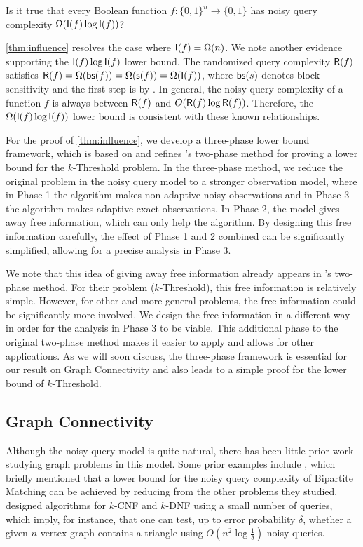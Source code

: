 \begin{open} \label{open:influence}
Is it true that every Boolean function $f: \{0, 1\}^n \rightarrow \{0, 1\}$ has noisy query complexity $\Omega(\operatorname{\mathsf{I}}(f) \log \operatorname{\mathsf{I}}(f))$?
\end{open}
\cref{thm:influence} resolves the case where $\operatorname{\mathsf{I}}(f) = \Omega(n)$. We note another evidence supporting the $\operatorname{\mathsf{I}}(f) \log \operatorname{\mathsf{I}}(f)$ lower bound. The randomized query complexity $\operatorname{\mathsf{R}}(f)$ satisfies $\operatorname{\mathsf{R}}(f) = \Omega(\operatorname{\mathsf{bs}}(f)) = \Omega(\operatorname{\mathsf{s}}(f)) = \Omega(\operatorname{\mathsf{I}}(f))$, where $\operatorname{\mathsf{bs}}(s)$ denotes block sensitivity and the first step is by \cite[Lemma 4.2]{nisan1989crew}. In general, the noisy query complexity of a function $f$ is always between $\operatorname{\mathsf{R}}(f)$ and $O(\operatorname{\mathsf{R}}(f) \log \operatorname{\mathsf{R}}(f))$. Therefore, the $\Omega(\operatorname{\mathsf{I}}(f) \log \operatorname{\mathsf{I}}(f))$ lower bound is consistent with these known relationships.

For the proof of \cref{thm:influence}, we develop a three-phase lower bound framework, which is based on and refines \cite{feige1994computing}'s two-phase method for proving a lower bound for the $k$-Threshold problem. In the three-phase method, we reduce the original problem in the noisy query model to a stronger observation model, where in Phase 1 the algorithm makes non-adaptive noisy observations and in Phase 3 the algorithm makes adaptive exact observations.
In Phase 2, the model gives away free information, which can only help the algorithm.
By designing this free information carefully, the effect of Phase 1 and 2 combined can be significantly simplified, allowing for a precise analysis in Phase 3.

We note that this idea of giving away free information already appears in \cite{feige1994computing}'s two-phase method.
For their problem ($k$-Threshold), this free information is relatively simple.
However, for other and more general problems, the free information could be significantly more involved.
We design the free information in a different way in order for the analysis in Phase 3 to be viable.
This additional phase to the original two-phase method makes it easier to apply and allows for other applications.
As we will soon discuss, the three-phase framework is essential for our result on Graph Connectivity and also leads to a simple proof for the lower bound of $k$-Threshold.

\subsection{Graph Connectivity}
Although the noisy query model is quite natural, there has been little prior work studying graph problems in this model. Some prior examples include \cite{feige1994computing}, which briefly mentioned that a lower bound for the noisy query complexity of Bipartite Matching can be achieved by reducing from the other problems they studied. \cite{DBLP:journals/rsa/KenyonK94} designed algorithms for $k$-CNF and $k$-DNF using a small number of queries, which imply, for instance, that one can test, up to error probability $\delta$, whether a given $n$-vertex graph contains a triangle using $O\left(n^2 \log \frac{1}{\delta}\right)$ noisy queries.


